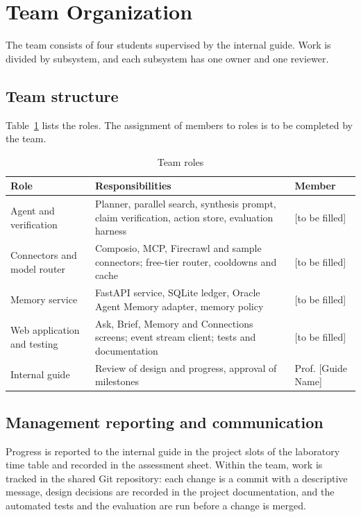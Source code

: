 \section{Team Organization}
\label{sec:team}
The team consists of four students supervised by the internal guide. Work is divided by subsystem, and each subsystem has one owner and one reviewer.
\subsection{Team structure}
Table~\ref{tab:roles} lists the roles. The assignment of members to roles is to be completed by the team.

\begin{table}[!htbp]
\begin{center}
\def\arraystretch{1.4}
\begin{tabularx}{\textwidth}{| p{4.2cm} | X | p{2.8cm} |}
\hline
Role & Responsibilities & Member \\ \hline
Agent and verification & Planner, parallel search, synthesis prompt, claim verification, action store, evaluation harness & [to be filled] \\ \hline
Connectors and model router & Composio, MCP, Firecrawl and sample connectors; free-tier router, cooldowns and cache & [to be filled] \\ \hline
Memory service & FastAPI service, SQLite ledger, Oracle Agent Memory adapter, memory policy & [to be filled] \\ \hline
Web application and testing & Ask, Brief, Memory and Connections screens; event stream client; tests and documentation & [to be filled] \\ \hline
Internal guide & Review of design and progress, approval of milestones & Prof. [Guide Name] \\ \hline
\end{tabularx}
\end{center}
\caption{Team roles}
\label{tab:roles}
\end{table}

\subsection{Management reporting and communication}
Progress is reported to the internal guide in the project slots of the laboratory time table and recorded in the assessment sheet. Within the team, work is tracked in the shared Git repository: each change is a commit with a descriptive message, design decisions are recorded in the project documentation, and the automated tests and the evaluation are run before a change is merged.

